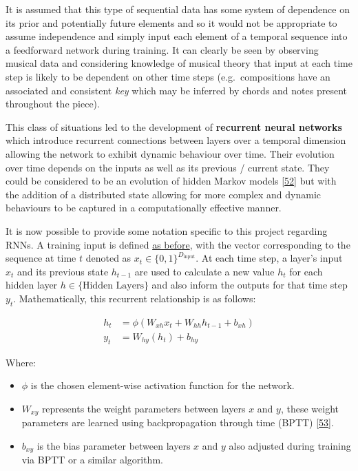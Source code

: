 \documentclass[12pt,]{article}
\providecommand{\tightlist}{%
  \setlength{\itemsep}{0pt}\setlength{\parskip}{0pt}}
\begin{document}
It is assumed that this type of sequential data has some system of
dependence on its prior and potentially future elements and so it would
not be appropriate to assume independence and simply input each element
of a temporal sequence into a feedforward network during training. It
can clearly be seen by observing musical data and considering knowledge
of musical theory that input at each time step is likely to be dependent
on other time steps (e.g.~compositions have an associated and consistent
\emph{key} which may be inferred by chords and notes present throughout
the piece).

This class of situations led to the development of \textbf{recurrent
neural networks} which introduce recurrent connections between layers
over a temporal dimension allowing the network to exhibit dynamic
behaviour over time. Their evolution over time depends on the inputs as
well as its previous / current state. They could be considered to be an
evolution of hidden Markov models
{[}\protect\hyperlink{ref-baum1966}{52}{]} but with the addition of a
distributed state allowing for more complex and dynamic behaviours to be
captured in a computationally effective manner.

It is now possible to provide some notation specific to this project
regarding RNNs. A training input is defined
\protect\hyperlink{buildinganeffectiverepresentationfortraining}{as
before}, with the vector corresponding to the sequence at time \(t\)
denoted as \(x_t\in \{0,1\}^{D_{\text{input}}}\). At each time step, a
layer's input \(x_t\) and its previous state \(h_{t-1}\) are used to
calculate a new value \(h_t\) for each hidden layer
\(h\in\{\text{Hidden Layers}\}\) and also inform the outputs for that
time step \(y_t\). Mathematically, this recurrent relationship is as
follows:

\[\begin{aligned}
h_t &= \phi(W_{xh} x_t + W_{hh} h_{t-1} + b_{xh}) \\
y_t &= W_{hy}(h_t) + b_{hy}
\end{aligned}\]

Where:

\begin{itemize}
\tightlist
\item
  \(\phi\) is the chosen element-wise activation function for the
  network.
\item
  \(W_{xy}\) represents the weight parameters between layers \(x\) and
  \(y\), these weight parameters are learned using backpropagation
  through time (BPTT)
  {[}\protect\hyperlink{ref-werbos1990backpropagation}{53}{]}.
\item
  \(b_{xy}\) is the bias parameter between layers \(x\) and \(y\) also
  adjusted during training via BPTT or a similar algorithm.
\end{itemize}
\end{document}
